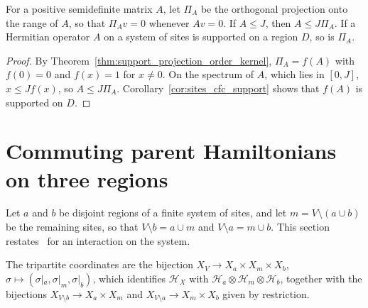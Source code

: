 \begin{lemma}
    \label{lem:martingale_range_projection}
    \leanok
    For a positive semidefinite matrix $A$, let $\Pi_A$ be the orthogonal projection
    onto the range of $A$, so that $\Pi_Av=0$ whenever $Av=0$. If $A\le J$, then
    $A\le J\Pi_A$. If a Hermitian operator $A$ on a system of sites is supported on a
    region $D$, so is $\Pi_A$.
\end{lemma}
\begin{proof}\leanok
    By Theorem~\ref{thm:support_projection_order_kernel}, $\Pi_A=f(A)$ with $f(0)=0$ and
    $f(x)=1$ for $x\neq0$. On the spectrum of $A$, which lies in $[0,J]$,
    $x\le Jf(x)$, so $A\le J\Pi_A$. Corollary~\ref{cor:sites_cfc_support} shows that
    $f(A)$ is supported on $D$.
\end{proof}

\section{Commuting parent Hamiltonians on three regions}
\label{sec:martingale_commuting_parent}

Let $a$ and $b$ be disjoint regions of a finite system of sites, and let
$m=V\setminus(a\cup b)$ be the remaining sites, so that $V\setminus b=a\cup m$ and
$V\setminus a=m\cup b$. This section restates~\cite[Appendix~D.2, lines
    2187--2289]{Cirac2016MPDO_arXiv} for an interaction on the system.

\begin{definition}
    \label{def:commuting_parent_coordinates}
    \leanok
    The tripartite coordinates are the bijection $X_V\to X_a\times X_m\times X_b$,
    $\sigma\mapsto(\sigma|_a,\sigma|_m,\sigma|_b)$, which identifies $\mathcal H_X$ with
    $\mathcal H_a\otimes\mathcal H_m\otimes\mathcal H_b$, together with the bijections
    $X_{V\setminus b}\to X_a\times X_m$ and $X_{V\setminus a}\to X_m\times X_b$ given by
    restriction.
\end{definition}

